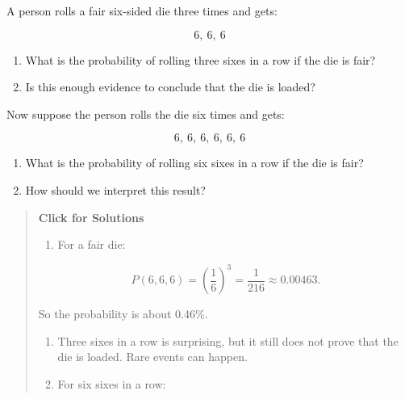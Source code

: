 \documentclass[
  letterpaper,
  DIV=11,
  numbers=noendperiod]{scrreprt}
\providecommand{\tightlist}{%
  \setlength{\itemsep}{0pt}\setlength{\parskip}{0pt}}
\begin{document}
\begin{tcolorbox}[enhanced jigsaw, arc=.35mm, bottomrule=.15mm, bottomtitle=1mm, breakable, colback=white, colbacktitle=quarto-callout-note-color!10!white, colframe=quarto-callout-note-color-frame, coltitle=black, left=2mm, leftrule=.75mm, opacityback=0, opacitybacktitle=0.6, rightrule=.15mm, title=\textcolor{quarto-callout-note-color}{\faInfo}\hspace{0.5em}{Question 3}, titlerule=0mm, toprule=.15mm, toptitle=1mm]

A person rolls a fair six-sided die three times and gets:

\[
6,\ 6,\ 6
\]

\begin{enumerate}
\def\labelenumi{\alph{enumi}.}
\item
  What is the probability of rolling three sixes in a row if the die is
  fair?
\item
  Is this enough evidence to conclude that the die is loaded?
\end{enumerate}

Now suppose the person rolls the die six times and gets:

\[
6,\ 6,\ 6,\ 6,\ 6,\ 6
\]

\begin{enumerate}
\def\labelenumi{\alph{enumi}.}
\setcounter{enumi}{2}
\item
  What is the probability of rolling six sixes in a row if the die is
  fair?
\item
  How should we interpret this result?
\end{enumerate}

\begin{quote}
\textbf{Click for Solutions}

\begin{enumerate}
\def\labelenumi{\alph{enumi}.}
\tightlist
\item
  For a fair die:
\end{enumerate}

\[
P(6,6,6)
=
\left(\frac{1}{6}\right)^3
=
\frac{1}{216}
\approx 0.00463.
\]

So the probability is about 0.46\%.

\begin{enumerate}
\def\labelenumi{\alph{enumi}.}
\setcounter{enumi}{1}
\item
  Three sixes in a row is surprising, but it still does not prove that
  the die is loaded. Rare events can happen.
\item
  For six sixes in a row:
\end{enumerate}


\end{quote}
\end{tcolorbox}
\end{document}
